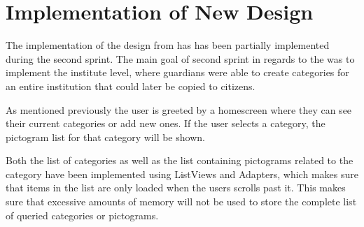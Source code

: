 \section{Implementation of New Design}
\label{sec:implementation_of_new_design}

The implementation of the design from  has has been partially implemented during the second sprint. The main goal of second sprint in regards to the \ct was to implement the institute level, where guardians were able to create categories for an entire institution that could later be copied to citizens.

As mentioned previously the user is greeted by a homescreen where they can see their current categories or add new ones. If the user selects a category, the pictogram list for that category will be shown. 

Both the list of categories as well as the list containing pictograms related to the category have been implemented using ListViews and Adapters, which makes sure that items in the list are only loaded when the users scrolls past it. This makes sure that excessive amounts of memory will not be used to store the complete list of queried categories or pictograms. 